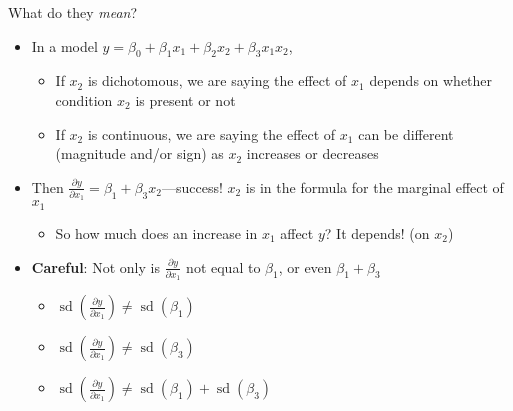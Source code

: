 \documentclass[
  ignorenonframetext,
]{beamer}
\providecommand{\tightlist}{%
  \setlength{\itemsep}{0pt}\setlength{\parskip}{0pt}}
\newcommand{\setsep}{\setlength{\itemsep}{3pt}}
\newcommand{\setskip}{\setlength{\parskip}{3pt}}
\renewcommand{\tightlist}{\setsep\setskip}
\begin{document}
\begin{frame}{What do they \emph{mean}?}
\label{what-do-they-mean}
\pause

\begin{itemize}[<+->]
\tightlist
\item
  In a model \(y = \beta_0 + \beta_1 x_1 + \beta_2 x_2 + \beta_3 x_1 x_2\),

  \begin{itemize}[<+->]
  \tightlist
  \item
    If \(x_2\) is dichotomous, we are saying the effect of \(x_1\) depends on whether condition \(x_2\) is present or not
  \item
    If \(x_2\) is continuous, we are saying the effect of \(x_1\) can be different (magnitude and/or sign) as \(x_2\) increases or decreases
  \end{itemize}
\item
  Then \(\ensuremath{\frac{\partial{y}}{\partial{x_1}}} = \beta_1 + \beta_3 x_2\)---success! \(x_2\) is in the formula for the marginal effect of \(x_1\)

  \begin{itemize}[<+->]
  \tightlist
  \item
    So how much does an increase in \(x_1\) affect \(y\)? It depends! (on \(x_2\))
  \end{itemize}
\item
  \textbf{Careful}: Not only is \(\ensuremath{\frac{\partial{y}}{\partial{x_1}}}\) not equal to \(\beta_1\), or even \(\beta_1 + \beta_3\)

  \begin{itemize}[<+->]
  \tightlist
  \item
    \(\mathop{\mathrm{sd}}\left( \ensuremath{\frac{\partial{y}}{\partial{x_1}}} \right) \neq \mathop{\mathrm{sd}}\left( \beta_1 \right)\)
  \item
    \(\mathop{\mathrm{sd}}\left( \ensuremath{\frac{\partial{y}}{\partial{x_1}}} \right) \neq \mathop{\mathrm{sd}}\left( \beta_3 \right)\)
  \item
    \(\mathop{\mathrm{sd}}\left( \ensuremath{\frac{\partial{y}}{\partial{x_1}}} \right) \neq \mathop{\mathrm{sd}}\left( \beta_1 \right) + \mathop{\mathrm{sd}}\left( \beta_3 \right)\)
  \end{itemize}
\end{itemize}
\end{frame}
\end{document}
